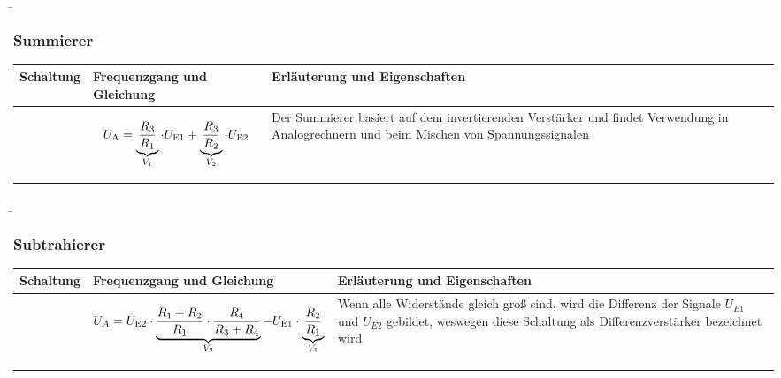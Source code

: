 
\begin{frame}
    \b{
    \frametitle{Summierer}
    \centering
    \begin{table}[ht]
    \label{tab:Summierer}
    \begin{tabular}{|m{}|m{}|m{}|}
    \hline
    Schaltung & Frequenzgang und Gleichung & Erläuterung und Eigenschaften\\ %
    \hline
    \vspace{0.5cm}
    \centering
    

    &
    \begin{center}
    
\end{center}
\vspace{1ex}
\[
\begin{aligned}
    U_{\textnormal{A}} = \underbrace{\frac{R_3} {R_1}}_{V_1} \cdot U_{\textnormal{E1}} + \underbrace{\frac{R_3} {R_2}}_{V_2} \cdot U_{\textnormal{E2}}
\end{aligned}
\]
    & 
    Der Summierer basiert auf dem invertierenden Verstärker und findet Verwendung in Analogrechnern und beim Mischen von Spannungssignalen \\
    \hline
    \end{tabular}
    \end{table}
    }
\end{frame}


\begin{frame}
    \b{
    \frametitle{Subtrahierer}
    \centering
    \begin{table}[ht]
    \label{tab:Subtrahierer}
    \begin{tabular}{|m{}|m{}|m{}|}
    \hline
    Schaltung & Frequenzgang und Gleichung & Erläuterung und Eigenschaften\\ %
    \hline
    \vspace{0.5cm}
    \centering
    
      &
      \begin{center}
      
 \end{center}
 \vspace{1ex}
 \[
 \begin{aligned}
    {U_A} = {U_{{\textnormal{E2}}}} \cdot \underbrace{ \frac{R_1 + R_2}{R_1} \cdot \frac{R_4}{R_3 + R_4}}_{V_2} - U_{\textnormal{E1}} \cdot \underbrace{\frac{R_2}{R_1}}_{V_1}
\end{aligned}
 \]
     &
     Wenn alle Widerstände gleich groß sind, wird die Differenz der Signale $U_{E1}$ und $U_{E2}$ gebildet, weswegen diese Schaltung als Differenzverstärker bezeichnet wird \\
    \hline
    \end{tabular}
    \end{table}
    }
\end{frame}

